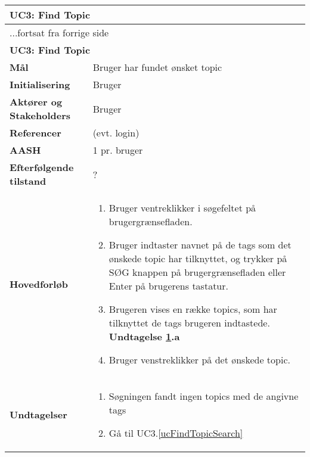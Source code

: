 \begin{center} \centering \label{ucFindTopic}
	\begin{longtable}{|p{4.6cm}|p{9.4cm}|}  %
	\hline
		\multicolumn{2}{|l|}{\textbf{UC3: Find Topic}} \\\hline
		\endfirsthead
		
		\multicolumn{2}{l}{...fortsat fra forrige side} \\ \hline %
		\multicolumn{2}{|l|}{\textbf{UC3: Find Topic}} \\\hline
		\endhead	
		
		\textbf{Mål}						& Bruger har fundet ønsket topic
		\\\hline
		\textbf{Initialisering}			& Bruger
		\\\hline
		\textbf{Aktører og Stakeholders}	&Bruger
		\\\hline 
		\textbf{Referencer}				& (evt. login)
		\\\hline
		\textbf{AASH}					& 1 pr. bruger
		\\\hline
		\textbf{Efterfølgende tilstand}	& ?
		\\\hline
		\textbf{Hovedforløb}					
			&\begin{enumerate}
				\item Bruger ventreklikker i søgefeltet på brugergrænsefladen.
				\item \label{ucFindTopicSearch} Bruger indtaster navnet på de tags %
				som det ønskede topic har tilknyttet, og trykker på SØG knappen på brugergrænsefladen eller Enter på brugerens tastatur.
				\item \label{ucFindTopicNoResults} Brugeren vises en række topics, som har tilknyttet de tags brugeren indtastede.
				\textbf{Undtagelse \ref{ucFindTopicNoResults}.a} \newline
				\item Bruger venstreklikker på det ønskede topic.
				
			\end{enumerate}\\\hline
		\textbf{Undtagelser}
			&\begin{enumerate} [label=\ref{ucFindTopicNoResults}.a]
				\item Søgningen fandt ingen topics med de angivne tags %
				\item Gå til UC3.\ref{ucFindTopicSearch}
			\end{enumerate}
						
			\\\hline
	\end{longtable} 
\end{center}